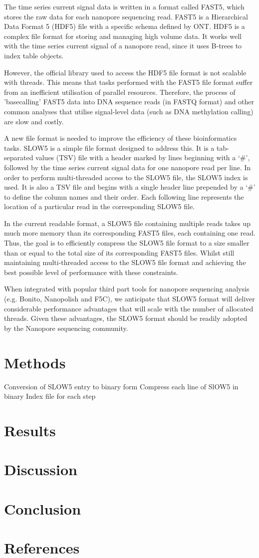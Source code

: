 \documentclass[a4paper, 12pt]{article}
\begin{document}
The time series current signal data is written in a format called FAST5, which stores the raw data for each nanopore sequencing read. FAST5 is a Hierarchical Data Format 5 (HDF5) file with a specific schema defined by ONT. HDF5 is a complex file format for storing and managing high volume data. It works well with the time series current signal of a nanopore read, since it uses B-trees to index table objects.

However, the official library used to access the HDF5 file format is not scalable with threads. This means that tasks performed with the FAST5 file format suffer from an inefficient utilisation of parallel resources. Therefore, the process of 'basecalling' FAST5 data into DNA sequence reads (in FASTQ format) and other common analyses that utilise signal-level data (such as DNA methylation calling) are slow and costly.

A new file format is needed to improve the efficiency of these bioinformatics tasks. SLOW5 is a simple file format designed to address this. It is a tab-separated values (TSV) file with a header marked by lines beginning with a `\#', followed by the time series current signal data for one nanopore read per line. In order to perform multi-threaded access to the SLOW5 file, the SLOW5 index is used. It is also a TSV file and begins with a single header line prepended by a `\#' to define the column names and their order. Each following line represents the location of a particular read in the corresponding SLOW5 file.

In the current readable format, a SLOW5 file containing multiple reads takes up much more memory than its corresponding FAST5 files, each containing one read. Thus, the goal is to efficiently compress the SLOW5 file format to a size smaller than or equal to the total size of its corresponding FAST5 files. Whilst still maintaining multi-threaded access to the SLOW5 file format and achieving the best possible level of performance with these constraints.

When integrated with popular third part tools for nanopore sequencing analysis (e.g. Bonito, Nanopolish and F5C), we anticipate that SLOW5 format will deliver considerable performance advantages that will scale with the number of allocated threads. Given these advantages, the SLOW5 format should be readily adopted by the Nanopore sequencing community.


\section{Methods}

Conversion of SLOW5 entry to binary form
Compress each line of SlOW5 in binary
Index file for each step

\section{Results}

\section{Discussion}

\section{Conclusion}

\section{References}
\end{document}
